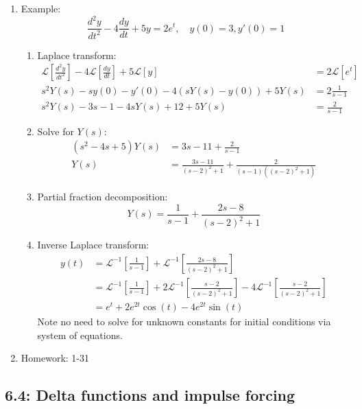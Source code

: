 \documentclass{article}
\begin{document}
\begin{enumerate}
\item Example: 
\[
\frac{d^2y}{dt^2}-4 \frac{dy}{dt}+5y = 2e^t, \quad y(0)=3, y'(0)=1
\]
\begin{enumerate}
\item Laplace transform:
\begin{align*}
\mathcal{L}\left[ \frac{d^2y}{dt^2}\right]-4 \mathcal{L}\left[ \frac{dy}{dt}\right]+5\mathcal{L}[ y] &= 2\mathcal{L}[e^t] \\
s^2Y(s)-sy(0)-y'(0)-4(sY(s)-y(0))+5Y(s) &= 2\frac{1}{s-1} \\
s^2Y(s)-3s-1-4sY(s)+12+5Y(s) &= \frac{2}{s-1} 
\end{align*}
\item Solve for $Y(s)$:
\begin{align*}
(s^2-4s+5)Y(s) &= 3s-11+\frac{2}{s-1} \\
Y(s) &= \frac{3s-11}{(s-2)^2+1}+\frac{2}{(s-1)((s-2)^2+1)} 
\end{align*}
\item Partial fraction decomposition:
\[
Y(s) = \frac{1}{s-1}+\frac{2s-8}{(s-2)^2+1}
\]
\item Inverse Laplace transform:
\begin{align*}
y(t) &= \mathcal{L}^{-1}\left[\frac{1}{s-1}\right]+\mathcal{L}^{-1}\left[\frac{2s-8}{(s-2)^2+1}\right] \\
&= \mathcal{L}^{-1}\left[\frac{1}{s-1}\right]+2\mathcal{L}^{-1}\left[\frac{s-2}{(s-2)^2+1}\right]-4\mathcal{L}^{-1}\left[\frac{s-2}{(s-2)^2+1}\right] \\
&= e^t + 2e^{2t}\cos(t)-4e^{2t}\sin(t)
\end{align*}
Note no need to solve for unknown constants for initial conditions via system of equations.
\end{enumerate}

\item Homework: 1-31

\end{enumerate}

\subsection{6.4: Delta functions and impulse forcing}
\end{document}
